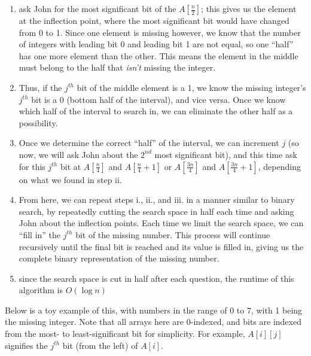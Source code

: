 \documentclass[12pt]{article}
\begin{document}
\begin{enumerate}
\begin{enumerate}
        \begin{enumerate}
            \item ask John for the most significant bit of the $A[\frac{n}{2}]$; this gives us 
            the element at the inflection point, where the most significant bit would have changed from 0 to 1. Since one 
            element is missing however, we know that the number of integers with leading bit 0 and leading bit 1 are not equal, 
            so one ``half'' has one more element than the other. This means the element in the middle must belong to the half 
            that \textit{isn't} missing the integer.
            \item Thus, if the $j^{th}$ bit of the middle element is a 1, we know the missing integer's $j^{th}$ bit is a 0 
            (bottom half of the interval), and vice versa. Once we know which half of the interval to search in, we can eliminate 
            the other half as a possibility.
            \item Once we determine the correct ``half'' of the interval, we can increment $j$ (so now, we will ask John about the $2^{nd}$ 
            most significant bit), and this time ask for this $j^{th}$ bit at $A[\frac{n}{4}]$ and $A[\frac{n}{4} + 1]$ or 
            $A[\frac{3n}{4}]$ and $A[\frac{3n}{4} + 1]$, depending on what we found in step ii.
            \item From here, we can repeat steps i., ii., and iii. in a manner similar to binary search, by repeatedly cutting 
            the search space in half each time and asking John about the inflection points. Each time we limit the search space, 
            we can ``fill in'' the $j^{th}$ bit of the missing number. This process will continue recursively until the final bit is 
            reached and its value is filled in, giving us the complete binary representation of the missing number.
            \item since the search space is cut in half after each question, the runtime of this algorithm is $O(\log n)$
        \end{enumerate}

        \newpage

        Below is a toy example of this, with numbers in the range of 0 to 7, with 1 being the missing integer. Note that all arrays here 
        are 0-indexed, and bits are indexed from the most- to least-significant bit for simplicity. For example, $A[i][j]$ signifies the $j^{th}$ bit 
        (from the left) of $A[i]$.


\end{enumerate}
\end{enumerate}
\end{document}
